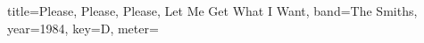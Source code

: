 \documentclass{skrul-leadsheet}
\begin{document}
\begin{song}[transpose-capo=true]{title={Please, Please, Please, Let Me Get What I Want}, band={The Smiths}, year={1984}, key={D}, meter={}}



\end{song}
\end{document}
